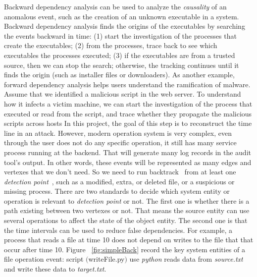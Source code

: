 Backward dependency analysis can be used to analyze the \emph{causality} of an anomalous event,
such as the creation of an unknown executable in a system.
Backward dependency analysis finds the origins of the executables by searching the events backward in time: 
(1) start the investigation of the processes that create the executables;
(2) from the processes, trace back to see which executables the processes executed;
(3) if the executables are from a trusted source, then we can stop the search; 
otherwise, the tracking continues until it finds the origin (such as installer files or downloaders).
As another example, forward dependency analysis helps users understand the ramification of malware.
Assume that we identified a malicious script in the web server. 
To understand how it infects a victim machine, we can start the investigation of the process that executed or read from the script,
and trace whether they propagate the malicious scripts across hosts
In this project, the goal of this step is to reconstruct the time line in an attack.
However, modern operation system is very complex, even through the user does not do any specific operation, it still has many service process running at the backend. That will generate many log records in the audit tool's output. In other words, these events will be represented as many edges and vertexes that we don't need. So we need to run backtrack~\cite{backtracking, backtracking2} from at least one \textit{detection point}~\cite{lamport1978time}, such as a modified, extra, or deleted file, or a suspicious or missing process. There are two standards to decide which system entity or operation is relevant to \textit{detection point} or not. The first one is whether there is a path existing between two vertexes or not. That means the source entity can use several operations to affect the state of the object entity. The second one is that the time intervals can be used to reduce false dependencies. For example, a process that reads a file at time 10 does not depend on writes to the file that that occur after time 10. Figure ~\ref{fig:simpleBack} record the key system entities of a file operation event: script $($writeFile.py$)$ use \textit{python} reads data from \textit{source.txt} and write these data to \textit{target.txt}.
